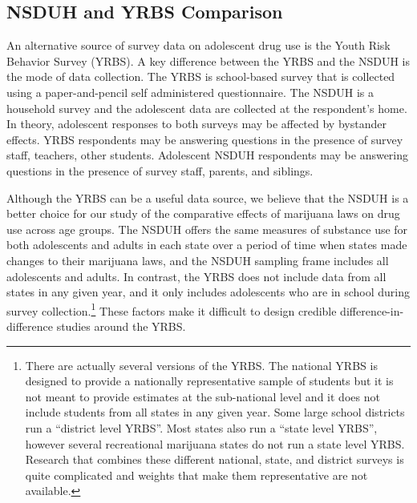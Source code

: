 \documentclass[12pt]{article}%
\begin{document}
\FloatBarrier


\begin{center}


\end{center}




\subsection{NSDUH and YRBS Comparison }\label{sec:yrbs_appendix}

An alternative source of survey data on adolescent drug use is the Youth Risk Behavior Survey (YRBS). A key difference between the YRBS and the NSDUH is the mode of data collection. The YRBS is school-based survey that is collected using a paper-and-pencil self administered questionnaire. The NSDUH is a household survey and the adolescent data are collected at the respondent's home. In theory, adolescent responses to both surveys may be affected by bystander effects. YRBS respondents may be answering questions in the presence of survey staff, teachers, other students. Adolescent NSDUH respondents may be answering questions in the presence of survey staff, parents, and siblings. 

Although the YRBS can be a useful data source, we believe that the NSDUH is a better choice for our study of the comparative effects of marijuana laws on drug use across age groups. The NSDUH offers the same measures of substance use for both adolescents and adults in each state over a period of time when states made changes to their marijuana laws, and the NSDUH sampling frame includes all adolescents and adults. In contrast, the YRBS does not include data from all states in any given year, and it only includes adolescents who are in school during survey collection.\footnote{There are actually several versions of the YRBS. The national YRBS is designed to provide a nationally representative sample of students but it is not meant to provide estimates at the sub-national level and it does not include students from all states in any given year. Some large school districts run a ``district level YRBS''. Most states also run a ``state level YRBS'', however several recreational marijuana states do not run a state level YRBS.  Research that combines these different national, state, and district surveys is quite complicated and weights that make them representative are not available.}%
These factors make it difficult to design credible difference-in-difference studies around the YRBS. 
\end{document}
